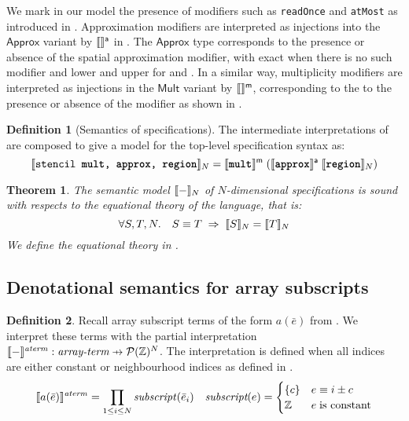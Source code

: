 \documentclass[acmlarge,review,anonymous]{acmart}\settopmatter{printfolios=true}
\theoremstyle{definition}
\newtheorem{defn}{Definition}
\theoremstyle{plain}
\newtheorem{thm}{Theorem}
\theoremstyle{remark}
\begin{document}
We mark in our model the presence of modifiers such as
\texttt{readOnce} and \texttt{atMost} as introduced in \Cref{}.
Approximation modifiers are interpreted as injections into the
$\mathsf{Approx}$ variant by $\llbracket{} {} \rrbracket{}^{\textsf{a}}$ in
.  The $\textsf{Approx}$ type corresponds
to the presence or absence of the spatial approximation modifier, with
\textsf{exact} when there is no such modifier and \textsf{lower} and
\textsf{upper} for  and . In a similar way,
multiplicity modifiers are interpreted as injections in the
$\mathsf{Mult}$ variant by $\llbracket{} {} \rrbracket{}^{\textsf{m}}$, corresponding to the to
the presence or absence of the  modifier as shown in
.

\begin{defn}[Semantics of specifications]
The intermediate interpretations of 
are composed to give a model for the top-level specification
syntax as:
%
\begin{equation*}
  \llbracket{} {\texttt{stencil \texttt{\textbf{mult}}, \texttt{\textbf{approx}}, \texttt{\textbf{region}}}} \rrbracket{}_N =
    \llbracket{} {\texttt{\textbf{mult}}} \rrbracket{}^{\textsf{m}} \;
           {(\llbracket{} {\texttt{\textbf{approx}}} \rrbracket{}^{\textsf{a}} \;
                    {\llbracket{} {\texttt{\textbf{region}}} \rrbracket{}_N)}}
\end{equation*}
\end{defn}
%
\begin{thm}
The semantic model $\llbracket{} {-} \rrbracket{}_N$ of $N$-dimensional specifications
is sound with respects to the equational theory of the language,
that is:
%
\begin{equation*}
\forall S, T, N . \quad
S \equiv T \; \Rightarrow \;
\llbracket{} {S} \rrbracket{}_N = \llbracket{} {T} \rrbracket{}_N
\end{equation*}
%
We define the equational theory in .
\end{thm}

\subsection{Denotational semantics for array subscripts}
\label{sec:fromcode}

\begin{defn}
  Recall array subscript terms of the form $a(\bar{e})$ from
  . We interpret these terms with the partial
  interpretation $\interp{-}^{\mathit{aterm}} : \textit{array-term}
  \prightarrow{} \mathcal{P}(\bz{})^N$. The interpretation is defined when
  all indices are either constant or neighbourhood indices as defined in
  .
%
  \begin{align*}
    \llbracket{} {a(\bar{e})} \rrbracket{}^{\mathit{aterm}} =
      \prod_{1 \leq i \leq N} \mathit{subscript}(\bar{e}_i) & &
    \textit{subscript}(e) = \begin{cases}
      \{ c \} & e \equiv i \pm c \\
      \textnormal{$\mathbb{Z}$} & e \; \mbox{is constant}
    \end{cases}
  \end{align*}
\end{defn}
\end{document}
